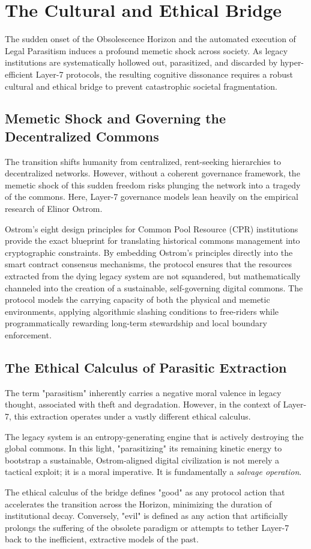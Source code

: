 \chapter{The Cultural and Ethical Bridge}
\label{ch:cultural_ethical_bridge}

The sudden onset of the Obsolescence Horizon and the automated execution of Legal Parasitism induces a profound memetic shock across society. As legacy institutions are systematically hollowed out, parasitized, and discarded by hyper-efficient Layer-7 protocols, the resulting cognitive dissonance requires a robust cultural and ethical bridge to prevent catastrophic societal fragmentation.

\section{Memetic Shock and Governing the Decentralized Commons}

The transition shifts humanity from centralized, rent-seeking hierarchies to decentralized networks. However, without a coherent governance framework, the memetic shock of this sudden freedom risks plunging the network into a tragedy of the commons. Here, Layer-7 governance models lean heavily on the empirical research of Elinor Ostrom.

Ostrom's eight design principles for Common Pool Resource (CPR) institutions provide the exact blueprint for translating historical commons management into cryptographic constraints. By embedding Ostrom's principles directly into the smart contract consensus mechanisms, the protocol ensures that the resources extracted from the dying legacy system are not squandered, but mathematically channeled into the creation of a sustainable, self-governing digital commons. The protocol models the carrying capacity of both the physical and memetic environments, applying algorithmic slashing conditions to free-riders while programmatically rewarding long-term stewardship and local boundary enforcement.

\section{The Ethical Calculus of Parasitic Extraction}

The term "parasitism" inherently carries a negative moral valence in legacy thought, associated with theft and degradation. However, in the context of Layer-7, this extraction operates under a vastly different ethical calculus.

The legacy system is an entropy-generating engine that is actively destroying the global commons. In this light, "parasitizing" its remaining kinetic energy to bootstrap a sustainable, Ostrom-aligned digital civilization is not merely a tactical exploit; it is a moral imperative. It is fundamentally a \textit{salvage operation}. 

The ethical calculus of the bridge defines "good" as any protocol action that accelerates the transition across the Horizon, minimizing the duration of institutional decay. Conversely, "evil" is defined as any action that artificially prolongs the suffering of the obsolete paradigm or attempts to tether Layer-7 back to the inefficient, extractive models of the past.
